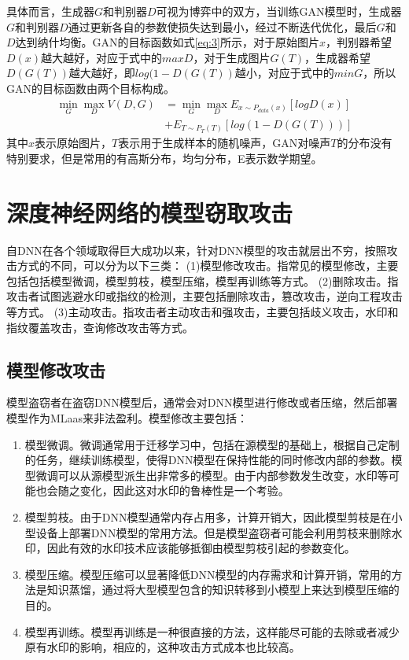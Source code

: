 具体而言，生成器$G$和判别器$D$可视为博弈中的双方，当训练GAN模型时，生成器$G$和判别器$D$通过更新各自的参数使损失达到最小，经过不断迭代优化，最后$G$和$D$达到纳什均衡。GAN的目标函数如式\ref{eq:3}所示，对于原始图片$x$，判别器希望$D(x)$越大越好，对应于式中的$maxD$，对于生成图片$G(T)$，生成器希望$D(G(T))$越大越好，即$log(1 - D(G(T))$越小，对应于式中的$minG$，所以GAN的目标函数由两个目标构成。
\begin{equation}
	\label{eq:3}
	\begin{split}
		\mathop{min} \limits_{G} \mathop{max} \limits_{D} V(D, G) &= \mathop{min} \limits_{G} \mathop{max} \limits_{D} E_{x \sim P_{data}(x)}[logD(x)] \\
		&+ E_{T \sim P_{T}(T)}[log(1 - D(G(T)))]
	\end{split}
\end{equation}
其中$x$表示原始图片，$T$表示用于生成样本的随机噪声，GAN对噪声$T$的分布没有特别要求，但是常用的有高斯分布，均匀分布，E表示数学期望。

\section{深度神经网络的模型窃取攻击}

自DNN在各个领域取得巨大成功以来，针对DNN模型的攻击就层出不穷，按照攻击方式的不同，可以分为以下三类\cite{xue2021intellectual}：
(1)模型修改攻击。指常见的模型修改，主要包括包括模型微调，模型剪枝，模型压缩，模型再训练等方式。
(2)删除攻击。指攻击者试图逃避水印或指纹的检测，主要包括删除攻击，篡改攻击，逆向工程攻击等方式。
(3)主动攻击。指攻击者主动攻击和强攻击，主要包括歧义攻击，水印和指纹覆盖攻击，查询修改攻击等方式。

\subsection{模型修改攻击}

模型盗窃者在盗窃DNN模型后，通常会对DNN模型进行修改或者压缩，然后部署模型作为MLaas来非法盈利。模型修改主要包括：

\begin{enumerate}
	\renewcommand{\labelenumi}{\theenumi)}
	\item 模型微调。微调通常用于迁移学习中，包括在源模型的基础上，根据自己定制的任务，继续训练模型，使得DNN模型在保持性能的同时修改内部的参数。模型微调可以从源模型派生出非常多的模型。由于内部参数发生改变，水印等可能也会随之变化，因此这对水印的鲁棒性是一个考验。
	\item 模型剪枝。由于DNN模型通常内存占用多，计算开销大，因此模型剪枝是在小型设备上部署DNN模型的常用方法。但是模型盗窃者可能会利用剪枝来删除水印，因此有效的水印技术应该能够抵御由模型剪枝引起的参数变化。
	\item 模型压缩。模型压缩可以显著降低DNN模型的内存需求和计算开销，常用的方法是知识蒸馏，通过将大型模型包含的知识转移到小模型上来达到模型压缩的目的。
	\item 模型再训练\cite{namba2019robust}。模型再训练是一种很直接的方法，这样能尽可能的去除或者减少原有水印的影响，相应的，这种攻击方式成本也比较高。
\end{enumerate}



